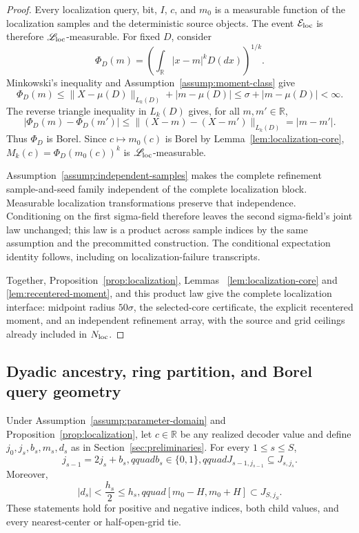 \begin{proof}
Every localization query, bit, $I$, $c$, and $m_0$ is a measurable function
of the localization samples and the deterministic source objects.  The event
$\mathcal E_{\rm loc}$ is therefore $\mathscr L_{\rm loc}$-measurable.
For fixed $D$, consider
\[
 \Phi_D(m)=\left(\int_{\mathbb R}|x-m|^kD(dx)\right)^{1/k}.
\]
Minkowski's inequality and Assumption~\ref{assump:moment-class} give
\[
 \Phi_D(m)\leq\|X-\mu(D)\|_{L_k(D)}+|m-\mu(D)|
 \leq\sigma+|m-\mu(D)|<\infty.
\]
The reverse triangle inequality in $L_k(D)$ gives, for all $m,m'\in\mathbb R$,
\[
 |\Phi_D(m)-\Phi_D(m')|
 \leq\|(X-m)-(X-m')\|_{L_k(D)}=|m-m'|.
\]
Thus $\Phi_D$ is Borel.  Since $c\mapsto m_0(c)$ is Borel by
Lemma~\ref{lem:localization-core},
$M_k(c)=\Phi_D(m_0(c))^k$ is $\mathscr L_{\rm loc}$-measurable.

Assumption~\ref{assump:independent-samples} makes the complete refinement
sample-and-seed family independent of the complete localization block.
Measurable localization transformations preserve that independence.
Conditioning on the first sigma-field therefore leaves the second sigma-field's
joint law unchanged; this law is a product across sample indices by the same
assumption and the precommitted construction.  The conditional expectation
identity follows, including on localization-failure transcripts.

Together, Proposition~\ref{prop:localization}, Lemmas~
\ref{lem:localization-core} and \ref{lem:recentered-moment}, and this product
law give the complete localization interface: midpoint radius $50\sigma$,
the selected-core certificate, the explicit recentered moment, and an
independent refinement array, with the source and grid ceilings already
included in $N_{\rm loc}$.
\end{proof}
\subsection{Dyadic ancestry, ring partition, and Borel query geometry}

\begin{lemma}
\label{lem:dyadic-ancestor}
Under Assumption~\ref{assump:parameter-domain} and
Proposition~\ref{prop:localization}, let $c\in\mathbb R$ be any realized
decoder value and define $j_0,j_s,b_s,m_s,d_s$ as in
Section~\ref{sec:preliminaries}.  For every $1\leq s\leq S$,
\[
 j_{s-1}=2j_s+b_s,qquad b_s\in\{0,1\},qquad
 J_{s-1,j_{s-1}}\subseteq J_{s,j_s}.
\]
Moreover,
\[
 |d_s|<\frac{h_s}{2}\leq h_s,qquad
 [m_0-H,m_0+H]\subset J_{S,j_S}.
\]
These statements hold for positive and negative indices, both child values,
and every nearest-center or half-open-grid tie.
\end{lemma}

